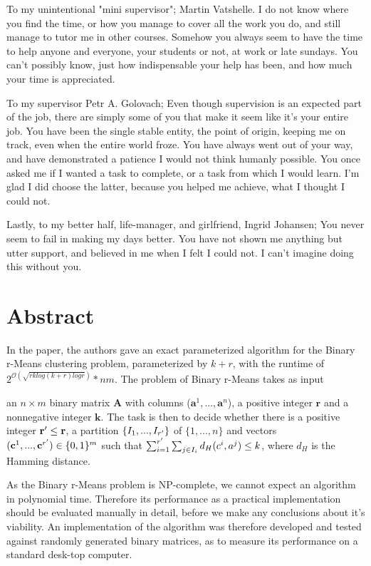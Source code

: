\documentclass[a4paper]{article}
\begin{document}
To my unintentional "mini supervisor"; Martin Vatshelle. I do not know where you find the time, or how you manage
to cover all the work you do, and still manage to tutor me in other courses. Somehow you always seem to have the time 
to help anyone and everyone, your students or not, at work or late sundays. You can't possibly know, just how indispensable
your help has been, and how much your time is appreciated.

To my supervisor Petr A. Golovach; Even though supervision is an expected part of the job, there are simply some of you that 
make it seem like it's your entire job. You have been the single stable entity, the point of origin, keeping me on
track, even when the entire world froze. You have always went out of your way, and have demonstrated a patience I would not 
think humanly possible. You once asked me if I wanted a task to complete, or a task from which I would learn. I'm glad I did 
choose the latter, because you helped me achieve, what I thought I could not.

Lastly, to my better half, life-manager, and girlfriend, Ingrid Johansen; You never seem to fail in making my days better. You have
not shown me anything but utter support, and believed in me when I felt I could not. I can't imagine doing this without you.

\newpage

%
%
\section*{Abstract}
In the \cite{fomin_golovach_panolan_2020} paper, the authors gave an exact parameterized
algorithm for the Binary r-Means clustering problem, parameterized by $k+r$, with the runtime of
$2^{\mathcal{O} (\sqrt{rk log(k+r) logr})}*nm$. The problem of Binary r-Means takes as input

an $n \times m$ binary matrix \textbf{A} with columns ($\textbf{a}^1,...,\textbf{a}^n$), a positive 
integer $\textbf{r}$ and a nonnegative integer $\textbf{k}$. 
The task is then to decide whether there is a positive integer $\textbf{r}\sp{\prime} \leq \textbf{r}$, 
a partition $\{I_1, ..., I_{r\sp{\prime}}\}$ of $\{1,...,n\}$ and vectors 
$(\textbf{c}^1,...,\textbf{c}^{r\sp{\prime}}) \in \{0,1\}^m$ such that 
$\sum_{i = 1}^{r\sp{\prime}} \sum_{j \in I_i} d_H(c^i, a^j) \leq k $, where $d_H$ is the Hamming distance.

As the Binary r-Means problem is NP-complete, we cannot expect an algorithm in polynomial time. Therefore its performance 
as a practical implementation should be evaluated manually in detail, before we make any conclusions about it's viability.
An implementation of the algorithm was therefore developed and tested against randomly generated binary matrices, 
as to measure its performance on a standard desk-top computer. 
\end{document}
